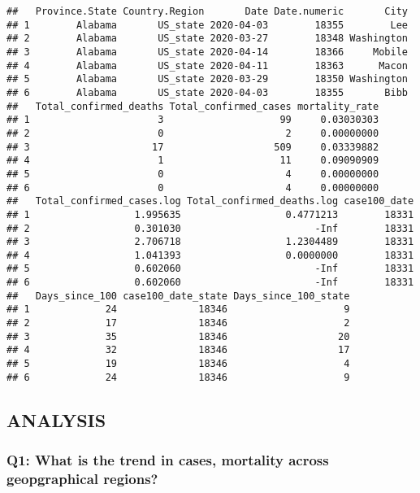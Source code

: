 \documentclass[]{article}
\begin{document}
\begin{verbatim}
##   Province.State Country.Region       Date Date.numeric       City
## 1        Alabama       US_state 2020-04-03        18355        Lee
## 2        Alabama       US_state 2020-03-27        18348 Washington
## 3        Alabama       US_state 2020-04-14        18366     Mobile
## 4        Alabama       US_state 2020-04-11        18363      Macon
## 5        Alabama       US_state 2020-03-29        18350 Washington
## 6        Alabama       US_state 2020-04-03        18355       Bibb
##   Total_confirmed_deaths Total_confirmed_cases mortality_rate
## 1                      3                    99     0.03030303
## 2                      0                     2     0.00000000
## 3                     17                   509     0.03339882
## 4                      1                    11     0.09090909
## 5                      0                     4     0.00000000
## 6                      0                     4     0.00000000
##   Total_confirmed_cases.log Total_confirmed_deaths.log case100_date
## 1                  1.995635                  0.4771213        18331
## 2                  0.301030                       -Inf        18331
## 3                  2.706718                  1.2304489        18331
## 4                  1.041393                  0.0000000        18331
## 5                  0.602060                       -Inf        18331
## 6                  0.602060                       -Inf        18331
##   Days_since_100 case100_date_state Days_since_100_state
## 1             24              18346                    9
## 2             17              18346                    2
## 3             35              18346                   20
## 4             32              18346                   17
## 5             19              18346                    4
## 6             24              18346                    9
\end{verbatim}

\subsection{ANALYSIS}\label{analysis}

\subsubsection{Q1: What is the trend in cases, mortality across
geopgraphical
regions?}\label{q1-what-is-the-trend-in-cases-mortality-across-geopgraphical-regions}
\end{document}
